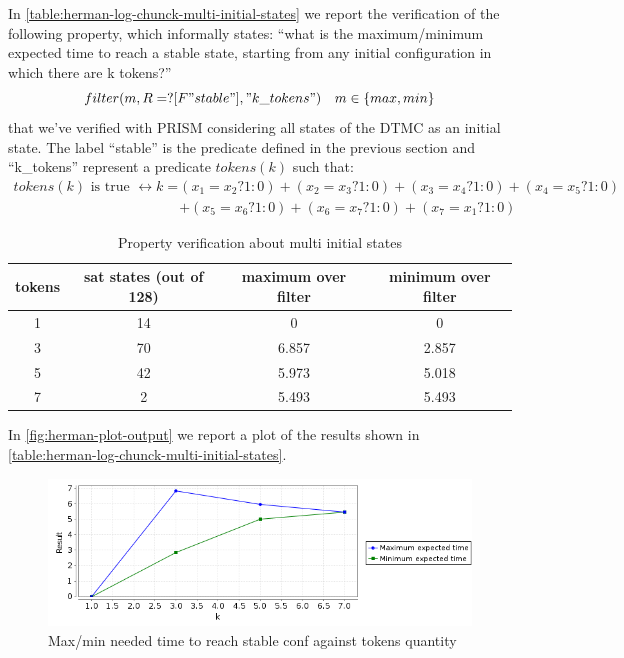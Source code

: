 In \autoref{table:herman-log-chunck-multi-initial-states} we report
the verification of the following property, which informally states:
``what is the maximum/minimum expected time to reach a stable state,
starting from any initial configuration in which there are k tokens?''
\begin{displaymath}
  filter(m, R=? [ F "stable" ], "k\_tokens") \quad m \in \{max, min\}
\end{displaymath}
that we've verified with PRISM considering all states of the DTMC as
an initial state. The label ``stable'' is the predicate defined in the
previous section and ``k\_tokens'' represent a predicate $tokens(k)$
such that:
\begin{displaymath}
  \begin{split}
    tokens(k) \text{ is true } \leftrightarrow k = &(x_1=x_2?1:0)+(x_2=x_3?1:0)+(x_3=x_4?1:0)+(x_4=x_5?1:0)\\
    &+(x_5=x_6?1:0)+(x_6=x_7?1:0)+(x_7=x_1?1:0)
  \end{split}
\end{displaymath}

\begin{table}[ht]
  \begin{center}
    \begin{tabular}{cccc}
      \hline
      tokens & sat states (out of 128)  & maximum over filter &
      minimum over filter \\ 
      \hline     
      1 & 14 & 0 & 0 \\
      3 & 70 & 6.857 & 2.857  \\
      5 & 42 & 5.973 & 5.018  \\
      7 & 2 & 5.493 & 5.493  \\ 
      \hline
    \end{tabular}
    \caption{Property verification about multi initial states}
    \label{table:herman-log-chunck-multi-initial-states}
  \end{center}
\end{table}

In \autoref{fig:herman-plot-output} we report a plot of the results
shown in \autoref{table:herman-log-chunck-multi-initial-states}.
\begin{figure}[htb]
  \centering
  \includegraphics[width=13cm]{quantitative-project/max-min-expected-time-experiment.png}
  \caption{Max/min needed time to reach stable conf against
    tokens quantity}
  \label{fig:herman-plot-output}
\end{figure}

